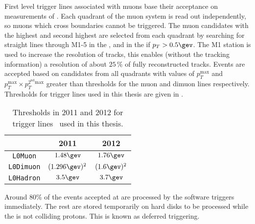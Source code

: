 First level trigger lines associated with muons base their acceptance on measurements of \pt.
Each quadrant of the muon system is read out independently, so muons which cross boundaries cannot
be triggered.
The muon candidates with the highest and second highest \pt are selected from each quadrant by
searching for straight lines through M1-5 in the , and in the  if
$p_T>0.5\gev$.
The M1 station is used to increase the \pt resolution of tracks, this enables (without the
tracking information) a resolution of about $25\,\%$ of fully reconstructed tracks.
Events are accepted based on candidates from all quadrants with values of $p_T^\mathrm{max}$ and
$p_T^\mathrm{max}\times p_T^\mathrm{2^{nd} max}$ greater than thresholds for the muon and dimuon
lines respectively.
Thresholds for \lone trigger lines used in this thesis are given in .

\begin{table}
  \caption[Level one trigger threholds]
  {
    Thresholds in 2011 and 2012 for \lone trigger lines~\cite{Albrecht:2013fba} used in this thesis.
  }
  \label{tab:lhcb:trigger}
  \begin{center}
    \begin{tabular}{ccc}\toprule
      &2011&2012\\\midrule
      {\tt L0Muon} & $1.48\gev$ & $1.76\gev$ \\
      {\tt L0Dimuon} & $(1.296\gev)^2$ & $(1.6\gev)^2$ \\
      {\tt L0Hadron} & $3.5\gev$ & $3.7\gev$ \\
      \bottomrule
    \end{tabular}
  \end{center}
\end{table}

Around $80\%$ of the events accepted at \lone are processed by the software triggers immediately.
The rest are stored temporarily on hard disks to be processed while the \lhc is not colliding protons.
This is known as deferred triggering.

